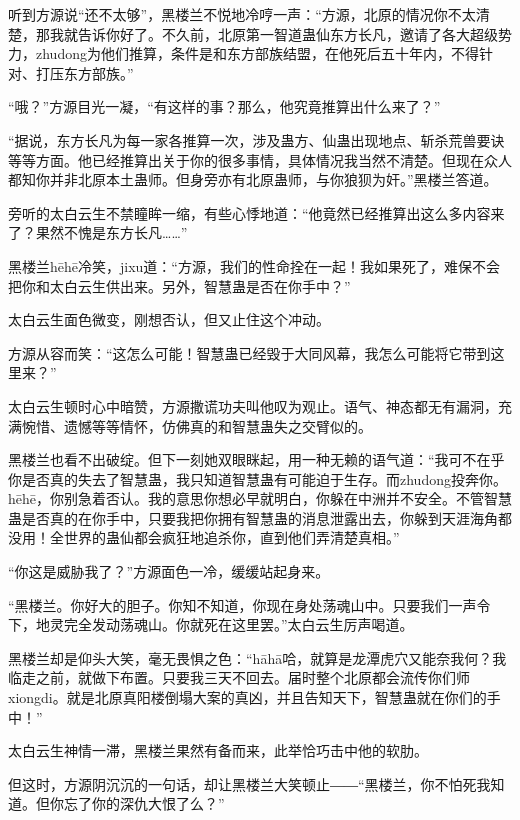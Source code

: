 
\begin{this_body}

听到方源说“还不太够”，黑楼兰不悦地冷哼一声：“方源，北原的情况你不太清楚，那我就告诉你好了。不久前，北原第一智道蛊仙东方长凡，邀请了各大超级势力，zhudong为他们推算，条件是和东方部族结盟，在他死后五十年内，不得针对、打压东方部族。”

“哦？”方源目光一凝，“有这样的事？那么，他究竟推算出什么来了？”

“据说，东方长凡为每一家各推算一次，涉及蛊方、仙蛊出现地点、斩杀荒兽要诀等等方面。他已经推算出关于你的很多事情，具体情况我当然不清楚。但现在众人都知你并非北原本土蛊师。但身旁亦有北原蛊师，与你狼狈为奸。”黑楼兰答道。

旁听的太白云生不禁瞳眸一缩，有些心悸地道：“他竟然已经推算出这么多内容来了？果然不愧是东方长凡……”

黑楼兰hēhē冷笑，jixu道：“方源，我们的性命拴在一起！我如果死了，难保不会把你和太白云生供出来。另外，智慧蛊是否在你手中？”

太白云生面色微变，刚想否认，但又止住这个冲动。

方源从容而笑：“这怎么可能！智慧蛊已经毁于大同风幕，我怎么可能将它带到这里来？”

太白云生顿时心中暗赞，方源撒谎功夫叫他叹为观止。语气、神态都无有漏洞，充满惋惜、遗憾等等情怀，仿佛真的和智慧蛊失之交臂似的。

黑楼兰也看不出破绽。但下一刻她双眼眯起，用一种无赖的语气道：“我可不在乎你是否真的失去了智慧蛊，我只知道智慧蛊有可能迫于生存。而zhudong投奔你。hēhē，你别急着否认。我的意思你想必早就明白，你躲在中洲并不安全。不管智慧蛊是否真的在你手中，只要我把你拥有智慧蛊的消息泄露出去，你躲到天涯海角都没用！全世界的蛊仙都会疯狂地追杀你，直到他们弄清楚真相。”

“你这是威胁我了？”方源面色一冷，缓缓站起身来。

“黑楼兰。你好大的胆子。你知不知道，你现在身处荡魂山中。只要我们一声令下，地灵完全发动荡魂山。你就死在这里罢。”太白云生厉声喝道。

黑楼兰却是仰头大笑，毫无畏惧之色：“hāhā哈，就算是龙潭虎穴又能奈我何？我临走之前，就做下布置。只要我三天不回去。届时整个北原都会流传你们师xiongdi。就是北原真阳楼倒塌大案的真凶，并且告知天下，智慧蛊就在你们的手中！”

太白云生神情一滞，黑楼兰果然有备而来，此举恰巧击中他的软肋。

但这时，方源阴沉沉的一句话，却让黑楼兰大笑顿止――“黑楼兰，你不怕死我知道。但你忘了你的深仇大恨了么？”


\end{this_body}
